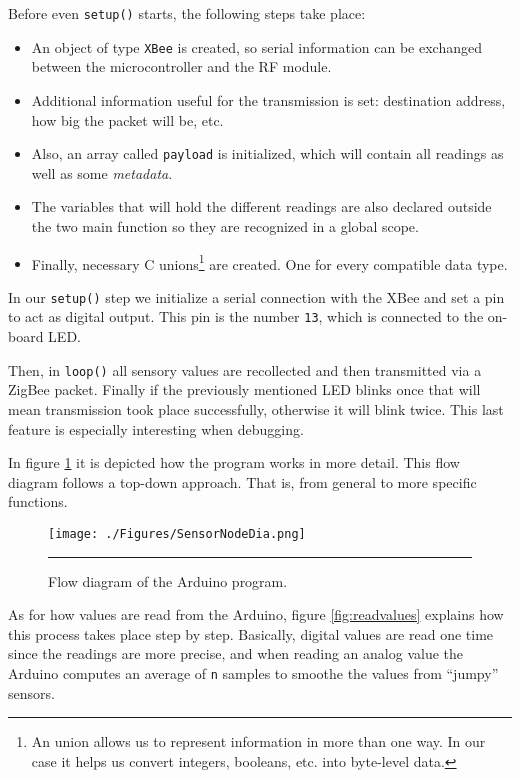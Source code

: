 Before even \texttt{setup()} starts, the following steps take place:

\begin{itemize}
    \item An object of type \texttt{XBee} is created, so serial information can be exchanged between the microcontroller and the RF module. 
    \item Additional information useful for the transmission is set: destination address, how big the packet will be, etc.
    \item Also, an array called \texttt{payload} is initialized, which will contain all readings as well as some \emph{metadata}. 
    \item The variables that will hold the different readings are also declared outside the two main function so they are recognized in a global scope.
    \item Finally, necessary C unions\footnote{An union allows us to represent information in more than one way. In our case it helps us convert integers, booleans, etc. into byte-level data.} are created. One for every compatible data type.
\end{itemize}

In our \texttt{setup()} step we initialize a serial connection with the XBee\textregistered{} and set a pin to act as digital output. This pin is the number \texttt{13}, which is connected to the on-board LED.

Then, in \texttt{loop()} all sensory values are recollected and then transmitted via a ZigBee packet. Finally if the previously mentioned LED blinks once that will mean transmission took place successfully, otherwise it will blink twice. This last feature is especially interesting when debugging.

In figure \ref{fig:ArduinoProgram} it is depicted how the program works in more detail. This flow diagram follows a top-down approach. That is, from general to more specific functions.

\begin{figure}[htbp]
    \centering
        \texttt{[image: ./Figures/SensorNodeDia.png]}
        \rule{35em}{0.5pt}
    \caption[Flow diagram of an Arduino-based node]{Flow diagram of the Arduino program.}
    \label{fig:ArduinoProgram}
\end{figure}

As for how values are read from the Arduino, figure \ref{fig:readvalues} explains how this process takes place step by step. Basically, digital values are read one time since the readings are more precise, and when reading an analog value the Arduino computes an average of \texttt{n} samples to smoothe the values from ``jumpy'' sensors.

